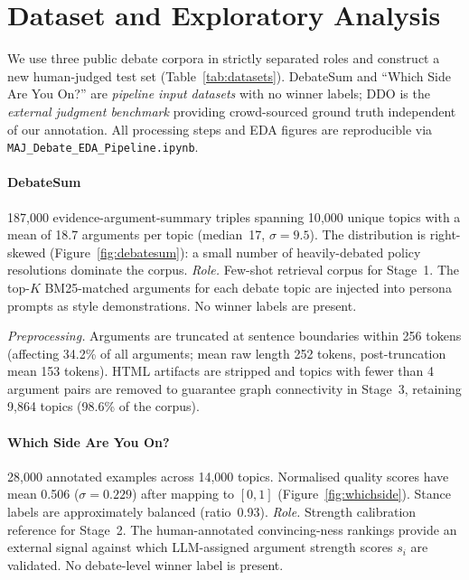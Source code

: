 \documentclass[11pt,twocolumn,letterpaper]{article}
\newcommand{\DebateSumTopics}{10{,}000}
\newcommand{\DebateSumArgs}{187{,}000}
\newcommand{\WhichSideTopics}{14{,}000}
\newcommand{\WhichSideArgs}{28{,}000}
\newcommand{\TruncLimit}{256}
\newcommand{\MinArgPairs}{4}
\newcommand{\AptMean}{18.7}
\newcommand{\AptMedian}{17}
\newcommand{\AptStd}{9.5}
\newcommand{\NTopicsKept}{9{,}864}
\newcommand{\PctTopicsKept}{98.6}
\newcommand{\PctArgsTrunc}{34.2}
\newcommand{\MeanRawTokens}{252}
\newcommand{\MeanTruncTokens}{153}
\newcommand{\QualityMean}{0.506}
\newcommand{\QualityStd}{0.229}
\newcommand{\StanceBalance}{0.93}
\begin{document}
\section{Dataset and Exploratory Analysis}
\label{sec:data}

We use three public debate corpora in strictly separated roles and construct
a new human-judged test set (Table~\ref{tab:datasets}). DebateSum and
``Which Side Are You On?'' are \textit{pipeline input datasets} with no
winner labels; DDO is the \textit{external judgment benchmark} providing
crowd-sourced ground truth independent of our annotation. All processing
steps and EDA figures are reproducible via
\texttt{MAJ\_Debate\_EDA\_Pipeline.ipynb}.

\paragraph{DebateSum~\citep{roush2020debatesum}}
\DebateSumArgs{} evidence-argument-summary triples spanning \DebateSumTopics{}
unique topics with a mean of \AptMean{} arguments per topic
(median~\AptMedian, $\sigma{=}\AptStd$). The distribution is right-skewed
(Figure~\ref{fig:debatesum}): a small number of heavily-debated policy
resolutions dominate the corpus.
\textit{Role.} Few-shot retrieval corpus for Stage~1. The top-$K$
BM25-matched arguments for each debate topic are injected into persona
prompts as style demonstrations. No winner labels are present.

\textit{Preprocessing.} Arguments are truncated at sentence boundaries
within \TruncLimit{} tokens (affecting \PctArgsTrunc\% of all arguments;
mean raw length \MeanRawTokens{} tokens, post-truncation mean
\MeanTruncTokens{} tokens). HTML artifacts are stripped and topics with
fewer than \MinArgPairs{} argument pairs are removed to guarantee graph
connectivity in Stage~3, retaining \NTopicsKept{} topics
(\PctTopicsKept\% of the corpus).

\paragraph{Which Side Are You On?~\citep{li2024whichside}}
\WhichSideArgs{} annotated examples across \WhichSideTopics{} topics.
Normalised quality scores have mean \QualityMean{} ($\sigma{=}\QualityStd$)
after mapping to $[0,1]$ (Figure~\ref{fig:whichside}). Stance labels are
approximately balanced (ratio~\StanceBalance).
\textit{Role.} Strength calibration reference for Stage~2. The
human-annotated convincing-ness rankings provide an external signal against
which LLM-assigned argument strength scores $s_i$ are validated. No
debate-level winner label is present.
\end{document}
